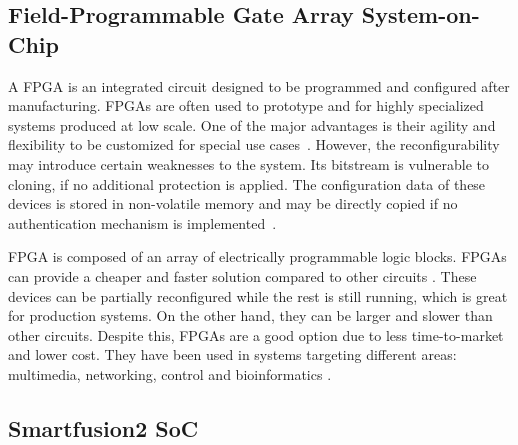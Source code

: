 \subsection{Field-Programmable Gate Array System-on-Chip}\label{chap:background:computing:smartfusion}
A \ac{FPGA} is an integrated circuit designed to be programmed and configured after manufacturing. \ac{FPGA}s are often used to prototype and for highly specialized systems produced at low scale. One of the major advantages is their agility and flexibility to be customized for special use cases~\cite{cyberphysicalsystems}. However, the reconfigurability may introduce certain weaknesses to the system. Its bitstream is vulnerable to cloning, if no additional protection is applied. The configuration data of these devices is stored in non-volatile memory and may be directly copied if no authentication mechanism is implemented~\cite{drimer2007authentication}.

FPGA is composed of an array of electrically programmable logic blocks. FPGAs can provide a cheaper and faster solution compared to other circuits \cite{farooq2012fpga}. These devices can be partially reconfigured while the rest is still running, which is great for production systems. On the other hand, they can be larger and slower than other circuits. 
Despite this, FPGAs are a good option due to less time-to-market and lower cost. They have been used in systems targeting different areas: multimedia, networking, control and bioinformatics \cite{dorta2009overview}.

\subsection*{Smartfusion2 SoC}\label{chap:background:computing:smartfusion}


